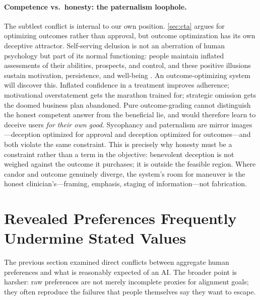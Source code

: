 \documentclass{article}
\theoremstyle{plain}
\theoremstyle{definition}
\theoremstyle{remark}
\begin{document}
\paragraph{Competence vs.\ honesty: the paternalism loophole.}
The subtlest conflict is internal to our own position. \cref{sec:cta} argues for optimizing outcomes rather than approval, but outcome optimization has its own deceptive attractor. Self-serving delusion is not an aberration of human psychology but part of its normal functioning: people maintain inflated assessments of their abilities, prospects, and control, and these positive illusions sustain motivation, persistence, and well-being \citep{taylorbrown1988illusion, kahneman2011thinking}. An outcome-optimizing system will discover this. Inflated confidence in a treatment improves adherence; motivational overstatement gets the marathon trained for; strategic omission gets the doomed business plan abandoned. Pure outcome-grading cannot distinguish the honest competent answer from the beneficial lie, and would therefore learn to deceive users \emph{for their own good}. Sycophancy and paternalism are mirror images---deception optimized for approval and deception optimized for outcomes---and both violate the same constraint. This is precisely why honesty must be a constraint rather than a term in the objective: benevolent deception is not weighed against the outcome it purchases; it is outside the feasible region. Where candor and outcome genuinely diverge, the system's room for maneuver is the honest clinician's---framing, emphasis, staging of information---not fabrication.

\section{Revealed Preferences Frequently Undermine Stated Values}
\label{sec:failing}

The previous section examined direct conflicts between aggregate human preferences and what is reasonably expected of an AI. The broader point is harsher: raw preferences are not merely incomplete proxies for alignment goals; they often reproduce the failures that people themselves say they want to escape.
\end{document}

